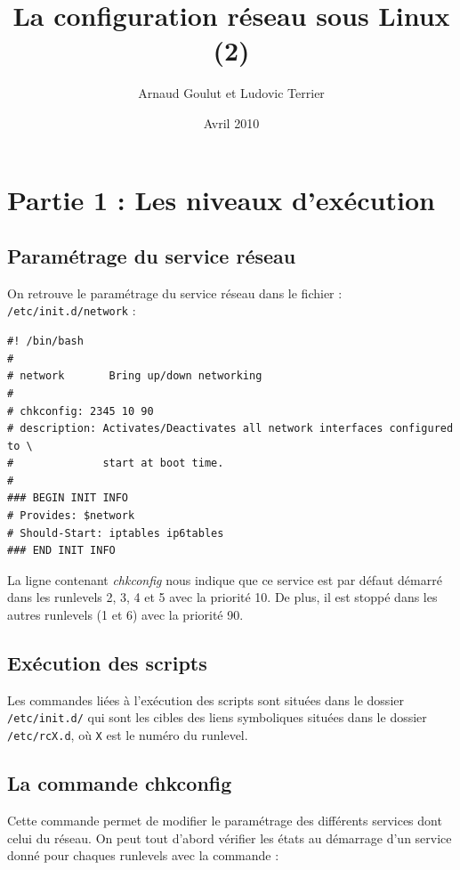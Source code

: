 \documentclass[12pt,a4paper,notitlepage]{article}
\begin{document}
\title{La configuration réseau sous Linux (2)}
\author{Arnaud Goulut et Ludovic Terrier}
\date{Avril 2010}
\maketitle



\thispagestyle{empty}




\section{Partie 1 : Les niveaux d'exécution}

\subsection{Paramétrage du service réseau}
On retrouve le paramétrage du service réseau dans le fichier : \texttt{/etc/init.d/network} :

\begin{lstlisting}
#! /bin/bash
#
# network       Bring up/down networking
#
# chkconfig: 2345 10 90
# description: Activates/Deactivates all network interfaces configured to \
#              start at boot time.
#
### BEGIN INIT INFO
# Provides: $network
# Should-Start: iptables ip6tables
### END INIT INFO
\end{lstlisting}

La ligne contenant \textit{chkconfig} nous indique que ce service est par défaut démarré dans les runlevels 2, 3, 4 et 5 avec la priorité 10. De plus, il est stoppé dans les autres runlevels (1 et 6) avec la priorité 90. 

\subsection{Exécution des scripts}

Les commandes liées à l'exécution des scripts sont situées dans le dossier \texttt{/etc/init.d/} qui sont les cibles des liens symboliques situées dans le dossier \texttt{/etc/rcX.d}, où \texttt{X} est le numéro du runlevel.


\subsection{La commande chkconfig}
Cette commande permet de modifier le paramétrage des différents services dont celui du réseau. On peut tout d'abord vérifier les états au démarrage d'un service donné pour chaques runlevels avec la commande :
\end{document}
